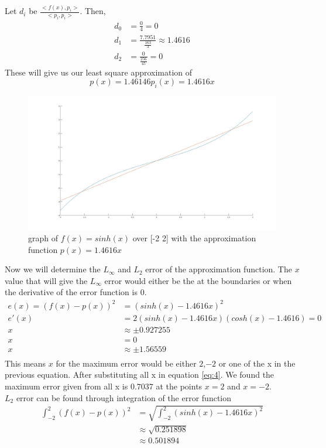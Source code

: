 \documentclass{article}
\begin{document}
Let $d_i$ be $\frac{<f(x),p_i>}{<p_i,p_i>}$. Then,
\begin{equation*}
\begin{aligned}
d_0 &= \frac{0}{4} = 0\\
d_1 &= \frac{7.7951}{\frac{163}{3}} \approx 1.4616\\
d_2 &= \frac{0}{\frac{256}{45}} = 0
\end{aligned}
\end{equation*}
These will give us our least square approximation of
\begin{equation} \label{eq:4}
p(x) = 1.46146p_i(x) = 1.4616x
\end{equation}
\begin{figure}[H]
\centering
\includegraphics[width=5in]{figures/q1d.jpg}
\caption{graph of $f(x) = sinh(x)$ over [-2 2] with the approximation function $p(x) = 1.4616x$}
\end{figure}
Now we will determine the $L_\infty$ and $L_2$ error of the approximation function. The $x$ value that will give the $L_\infty$ error would either be the at the boundaries or when the derivative of the error function is $0$.
\begin{equation*}
\begin{aligned}
e(x) = (f(x) - p(x))^2 &= (sinh(x) - 1.4616x)^2\\
e'(x) &= 2(sinh(x) - 1.4616x)(cosh(x) - 1.4616) = 0\\
x &\approx \pm 0.927255\\
x &= 0 \\
x &\approx \pm 1.56559\\
\end{aligned}
\end{equation*}
This means $x$ for the maximum error would be either $2$,$-2$ or one of the x in the previous equation. After substituting all x in equation \ref{eq:4}. We found the maximum error given from all x is $0.7037$ at the points $x = 2$ and $x = -2$.\\
$L_2$ error can be found through integration of the error function
\begin{equation*}
\begin{aligned}
\int_{-2}^2(f(x) - p(x))^2 &= \sqrt{\int_{-2}^2(sinh(x) - 1.4616x)^2}\\
							&\approx \sqrt{0.251898}\\
							&\approx 0.501894
\end{aligned}
\end{equation*}
\end{document}
